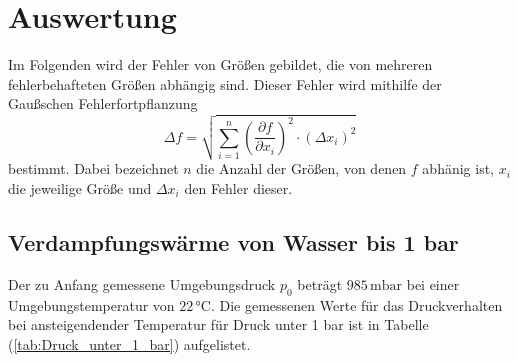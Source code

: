 \section{Auswertung}
\label{sec:Auswertung}
Im Folgenden wird der Fehler von Größen gebildet, die von mehreren fehlerbehafteten Größen abhängig sind. Dieser Fehler wird mithilfe der Gaußschen 
Fehlerfortpflanzung 
$$\Delta f = \sqrt{\sum_{i = 1}^{n} \left( \frac{\partial f}{\partial x_i} \right)^2 \cdot \left(\Delta x_i \right)^2}$$
bestimmt. Dabei bezeichnet $n$ die Anzahl der Größen, von denen $f$ abhänig ist, $x_i$ die jeweilige Größe und $\Delta x_i$ den Fehler dieser. \\

  \subsection{Verdampfungswärme von Wasser bis 1 bar}
   Der zu Anfang gemessene Umgebungsdruck $p_0$ beträgt $985\,\unit{\milli\bar}$ bei einer Umgebungstemperatur von $22 \,\unit{\celsius}$. 
  Die gemessenen Werte für das Druckverhalten bei ansteigendender Temperatur für 
  Druck unter 1 bar ist in Tabelle (\ref{tab:Druck_unter_1_bar}) aufgelistet. 

